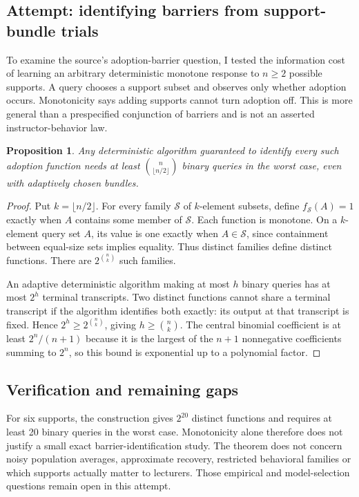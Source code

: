 \documentclass[11pt]{article}
\newtheorem{proposition}{Proposition}
\begin{document}
\subsection{Attempt: identifying barriers from support-bundle trials}
To examine the source's adoption-barrier question, I tested the information cost of learning an arbitrary deterministic monotone response to $n\ge2$ possible supports. A query chooses a support subset and observes only whether adoption occurs. Monotonicity says adding supports cannot turn adoption off. This is more general than a prespecified conjunction of barriers and is not an asserted instructor-behavior law.
\begin{proposition}
Any deterministic algorithm guaranteed to identify every such adoption function needs at least $\binom n{\lfloor n/2\rfloor}$ binary queries in the worst case, even with adaptively chosen bundles.
\end{proposition}
\begin{proof}
Put $k=\lfloor n/2\rfloor$. For every family $\mathcal S$ of $k$-element subsets, define $f_{\mathcal S}(A)=1$ exactly when $A$ contains some member of $\mathcal S$. Each function is monotone. On a $k$-element query set $A$, its value is one exactly when $A\in\mathcal S$, since containment between equal-size sets implies equality. Thus distinct families define distinct functions. There are $2^{\binom nk}$ such families.

An adaptive deterministic algorithm making at most $h$ binary queries has at most $2^h$ terminal transcripts. Two distinct functions cannot share a terminal transcript if the algorithm identifies both exactly: its output at that transcript is fixed. Hence $2^h\ge2^{\binom nk}$, giving $h\ge\binom nk$. The central binomial coefficient is at least $2^n/(n+1)$ because it is the largest of the $n+1$ nonnegative coefficients summing to $2^n$, so this bound is exponential up to a polynomial factor.
\end{proof}
\subsection{Verification and remaining gaps}
For six supports, the construction gives $2^{20}$ distinct functions and requires at least 20 binary queries in the worst case. Monotonicity alone therefore does not justify a small exact barrier-identification study. The theorem does not concern noisy population averages, approximate recovery, restricted behavioral families or which supports actually matter to lecturers. Those empirical and model-selection questions remain open in this attempt.
\end{document}
